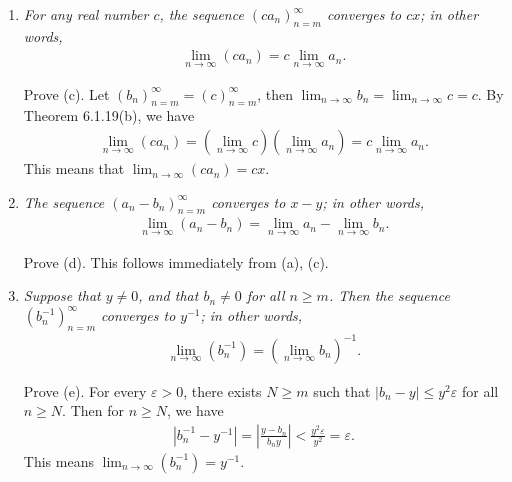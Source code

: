 \documentclass{book}
\begin{document}
\begin{enumerate}
    \item \emph{For any real number $c$, the sequence $(ca_n)_{n=m}^\infty$ converges to $cx$; in other words,}
    \begin{align*}
        \lim_{n\to\infty}(ca_n)=c\lim_{n\to\infty}a_n.
    \end{align*}

    Prove (c). Let $(b_n)_{n=m}^{\infty}=(c)_{n=m}^{\infty}$, then $\lim_{n\to\infty}b_n=\lim_{n\to\infty}c=c$. By Theorem 6.1.19(b), we have
    \begin{align*}
        \lim_{n\to\infty}(ca_n)=(\lim_{n\to\infty}c)(\lim_{n\to\infty}a_n)=c\lim_{n\to\infty}a_n.
    \end{align*}
    This means that $\lim_{n\to\infty}(ca_n)=cx$.

    \item \emph{The sequence $(a_n-b_n)_{n=m}^\infty$ converges to $x-y$; in other words,}
    \begin{align*}
        \lim_{n\to\infty}(a_n-b_n)=\lim_{n\to\infty}a_n-\lim_{n\to\infty}b_n.
    \end{align*}

    Prove (d). This follows immediately from (a), (c).
    \begin{comment}
    Prove (d). For every $\varepsilon>0$, there exist $N',N''\geq m$ such that $|a_n-x|\leq\varepsilon/2$ and $|b_n-y|\leq\varepsilon/2$ for all $n\geq N'$ and $n\geq N''$. Then for $n\geq N=\max(N',N'')$
        \begin{align*}
            |(a_n-b_n)-(x-y)|\leq|a_n-x|+|b_n-y|\leq\varepsilon/2+\varepsilon/2=\varepsilon,
        \end{align*}
    which means $\lim_{n\to\infty}(a_n-b_n)=x-y$. This proves assertion (d).
    \end{comment}
    \item \emph{Suppose that $y\neq 0$, and that $b_n\neq 0$ for all $n\geq m$. Then the sequence $(b^{-1}_n)_{n=m}^\infty$ converges to $y^{-1}$; in other words,}
    \begin{align*}
        \lim_{n\to\infty}(b^{-1}_n)=(\lim_{n\to\infty}b_n)^{-1}.
    \end{align*}

    Prove (e). For every $\varepsilon>0$, there exists $N\geq m$ such that $|b_n-y|\leq y^2\varepsilon$ for all $n\geq N$. Then for $n\geq N$, we have
    \begin{align*}
        |b_n^{-1}-y^{-1}|=\left|\frac{y-b_n}{b_ny}\right|<\frac{y^2\varepsilon}{y^2}=\varepsilon.
    \end{align*}
    This means $\lim_{n\to\infty}(b^{-1}_n)=y^{-1}$.


\end{enumerate}
\end{document}
